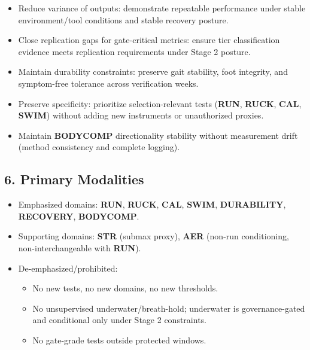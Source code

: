 \documentclass[10pt]{article}
\begin{document}
\begin{itemize}
\item Reduce variance of outputs: demonstrate repeatable performance under stable environment/tool conditions and stable recovery posture.
\item Close replication gaps for gate-critical metrics: ensure tier classification evidence meets replication requirements under Stage 2 posture.
\item Maintain durability constraints: preserve gait stability, foot integrity, and symptom-free tolerance across verification weeks.
\item Preserve specificity: prioritize selection-relevant tests (\textbf{RUN}, \textbf{RUCK}, \textbf{CAL}, \textbf{SWIM}) without adding new instruments or unauthorized proxies.
\item Maintain \textbf{BODYCOMP} directionality stability without measurement drift (method consistency and complete logging).
\end{itemize}

\subsection*{6. Primary Modalities}

\begin{itemize}
\item Emphasized domains: \textbf{RUN}, \textbf{RUCK}, \textbf{CAL}, \textbf{SWIM}, \textbf{DURABILITY}, \textbf{RECOVERY}, \textbf{BODYCOMP}.
\item Supporting domains: \textbf{STR} (submax proxy), \textbf{AER} (non-run conditioning, non-interchangeable with \textbf{RUN}).
\item De-emphasized/prohibited:
  \begin{itemize}
  \item No new tests, no new domains, no new thresholds.
  \item No unsupervised underwater/breath-hold; underwater is governance-gated and conditional only under Stage 2 constraints.
  \item No gate-grade tests outside protected windows.
  \end{itemize}
\end{itemize}
\end{document}

